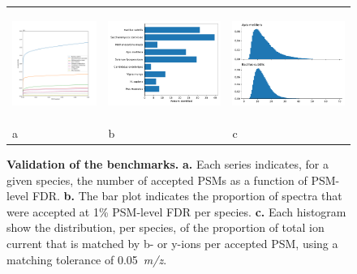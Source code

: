 \documentclass{article}
\begin{document}
\begin{figure}
  \centering
  \begin{tabular}{lll}
    \includegraphics[height=1.4in]{nine-species-fdr.pdf} &
    \includegraphics[height=1.4in]{percent-id.pdf}  &
    \includegraphics[height=1.4in]{match-by.pdf}  \\
    a & b & c \\
  \end{tabular}
  \caption{\textbf{Validation of the benchmarks.}
    \textbf{a.} Each series indicates, for a given species, the number of accepted PSMs as a function of PSM-level FDR.
    \textbf{b.} The bar plot indicates the proportion of spectra that were accepted at 1\% PSM-level FDR per species.
    \textbf{c.} Each histogram show the distribution, per species, of the proportion of total ion current that is matched by b- or y-ions per accepted PSM, using a matching tolerance of 0.05~\textit{m/z}.}
  \label{fig:fdr}
\end{figure}
\end{document}
